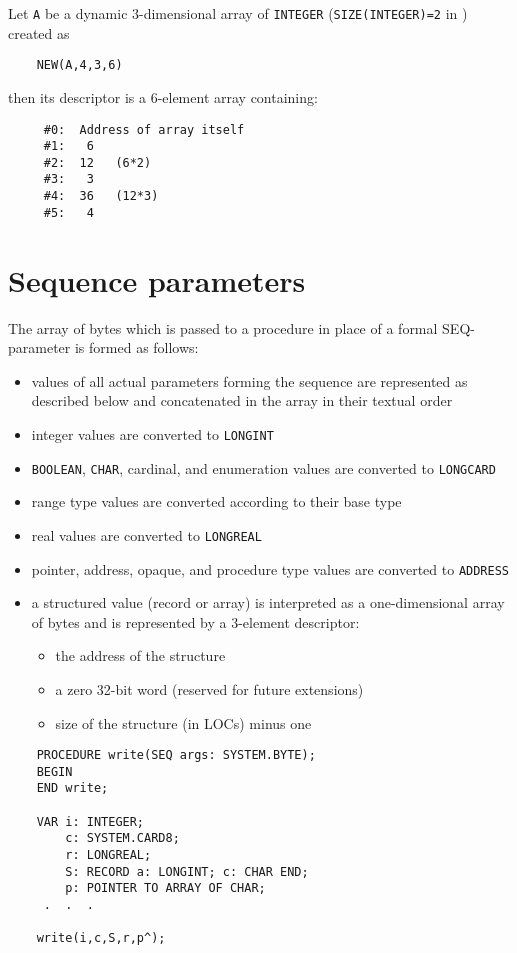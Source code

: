 Let {\tt A} be a dynamic $3$-dimensional array
of {\tt INTEGER} ({\tt SIZE(INTEGER)=2} in \ot{}) created as

\verb'    NEW(A,4,3,6)'

then its descriptor is a 6-element array containing:

\begin{verbatim}
     #0:  Address of array itself
     #1:   6
     #2:  12   (6*2)
     #3:   3   
     #4:  36   (12*3)
     #5:   4
\end{verbatim}

\section{Sequence parameters}\label{lowlevel:seqrep}

The array of bytes which is passed to a procedure in place of a formal
SEQ-parameter is formed as follows:
\begin{itemize}
\item
  values of all actual parameters forming the sequence are represented
  as described below and concatenated in the array in their textual order
\item integer values are converted to \verb'LONGINT'
\item \verb'BOOLEAN', \verb'CHAR', cardinal, and enumeration values are converted
      to \verb'LONGCARD'
\item range type values are converted according to their base type
\item real values are converted to \verb'LONGREAL'
\item pointer, address, opaque, and procedure type values
are converted to \verb'ADDRESS'
\item
    a structured value (record or array) is interpreted
    as a one-dimensional array of bytes and
    is represented by a 3-element descriptor:
    \begin{itemize}
    \item the address of the structure
    \item a zero 32-bit word (reserved for future extensions)
    \item size of the structure (in LOCs) minus one
    \end{itemize}
\end{itemize}

\Example
\begin{verbatim}
    PROCEDURE write(SEQ args: SYSTEM.BYTE);
    BEGIN
    END write;

    VAR i: INTEGER;
        c: SYSTEM.CARD8;
        r: LONGREAL;
        S: RECORD a: LONGINT; c: CHAR END;
        p: POINTER TO ARRAY OF CHAR;
     .  .  .

    write(i,c,S,r,p^);
\end{verbatim}

